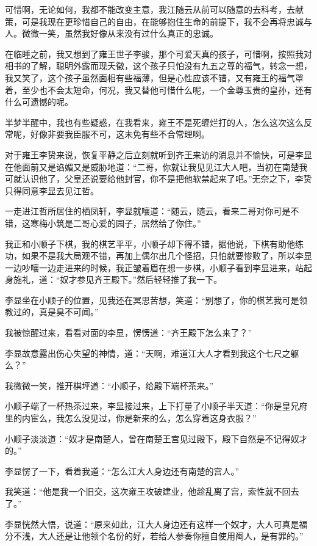可惜啊，无论如何，我都不能改变主意，我江随云从前可以随意的去科考，去献策，可是我现在更珍惜自己的自由，在能够抱住生命的前提下，我不会再将忠诚与人。微微一笑，虽然我好像从来没有过什么真正的忠诚。

在临睡之前，我又想到了雍王世子李骏，那个可爱天真的孩子，可惜啊，按照我对相书的了解，聪明外露而现夭徵，这个孩子只怕没有九五之尊的福气，转念一想，我又笑了，这个孩子虽然面相有些福薄，但是心性应该不错，又有雍王的福气罩着，至少也不会太短命，何况，我又替他可惜什么呢，一个金尊玉贵的皇孙，还有什么可遗憾的呢。

半梦半醒中，我也有些疑惑，在我看来，雍王不是死缠烂打的人，怎么这次这么反常呢，好像非要我臣服不可，这未免有些不合常理啊。

对于雍王李贽来说，恢复平静之后立刻就听到齐王来访的消息并不愉快，可是李显在他面前又是谄媚又是威胁地道：“二哥，你就让我见见江大人吧，当初在南楚我可就认识他了，父皇还说要给他封官，你不是把他软禁起来了吧。”无奈之下，李贽只得同意李显去见江哲。

一走进江哲所居住的栖凤轩，李显就嚷道：“随云，随云，看来二哥对你可是不错，这寒梅小筑是二哥心爱的园子，居然给了你住。”

我正和小顺子下棋，我的棋艺平平，小顺子却下得不错，据他说，下棋有助他练功，如果不是我大局观不错，再加上偶尔出几个怪招，只怕就要惨败了，所以李显一边吵嚷一边走进来的时候，我正皱着眉在想一步棋，小顺子看到李显进来，站起身施礼，道：“奴才参见齐王殿下。”然后轻轻推了我一下。

李显坐在小顺子的位置，见我还在冥思苦想，笑道：“别想了，你的棋艺我可是领教过的，真是臭不可闻。”

我被惊醒过来，看看对面的李显，愣愣道：“齐王殿下怎么来了？”

李显故意露出伤心失望的神情，道：“天啊，难道江大人才看到我这个七尺之躯么？”

我微微一笑，推开棋坪道：“小顺子，给殿下端杯茶来。”

小顺子端了一杯热茶过来，李显接过来，上下打量了小顺子半天道：“你是皇兄府里的内宦么，我怎么没见过，你是新来的么，怎么穿着这身衣服？”

小顺子淡淡道：“奴才是南楚人，曾在南楚王宫见过殿下，殿下自然是不记得奴才的。”

李显愣了一下，看着我道：“怎么江大人身边还有南楚的宫人。”

我笑道：“他是我一个旧交，这次雍王攻破建业，他趁乱离了宫，索性就不回去了。”

李显恍然大悟，说道：“原来如此，江大人身边还有这样一个奴才，大人可真是福分不浅，大人还是让他领个名份的好，若给人参奏你擅自使用阉人，是有罪的。”

